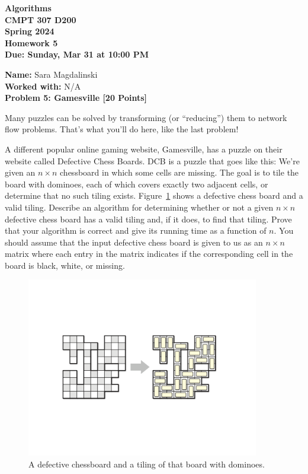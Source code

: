 \documentclass[12pt]{article}
\newcommand{\Name}[1]{\noindent \textbf{Name:} #1 \\}
\newcommand{\Workedwith}[1]{\noindent \textbf{Worked with:} #1 \\}
\newcommand{\Problem}[3]{\mbox{} \newline \noindent \textbf{\textbf{Problem #1: #2 [#3 Points] \\ }}}
\begin{document}
\begin{center}
  \bf
  Algorithms \\
  CMPT 307 D200 \\
  Spring 2024 \\
  \rm
  Homework 5\\
  Due:  Sunday, Mar 31 at 10:00 PM \\
\end{center}

\Name{Sara Magdalinski}
\Workedwith{N/A}

\Problem{5}{Gamesville}{20}

Many puzzles can be solved by transforming (or ``reducing'') them to network flow problems.  That's what you'll do here, like the last problem!

A different popular online gaming website, Gamesville, has a puzzle on their website called Defective Chess Boards. DCB is a puzzle that goes like this:  We're given an $n \times n$ chessboard in which some cells are missing.  The goal is to tile the board with dominoes, each of which covers exactly two adjacent cells, or determine
that no such tiling exists.  Figure~\ref{fig:dominoes} shows a defective chess board and a valid tiling.  Describe an algorithm for determining whether or not a given $n \times n$ defective chess board has a valid tiling and, if it does, to find that tiling.  Prove
that your algorithm is correct and give its running time as a function of $n$.  You should assume that the input defective chess board is given to us as an $n \times n$ matrix where each entry in the matrix indicates if the corresponding cell in the board is black, white, or missing.

\begin{figure}[h]
\begin{center}
\includegraphics[width=4in]{Dominoes.pdf}
\end{center}
\caption{A defective chessboard and a tiling of that board with dominoes.}
\label{fig:dominoes}
\end{figure}
\end{document}
